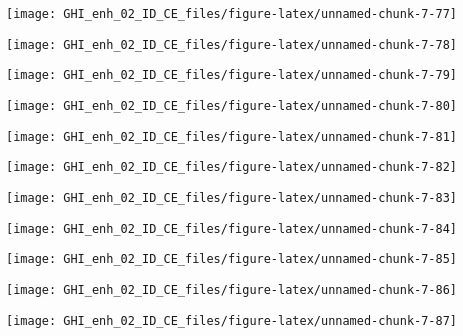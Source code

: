 \documentclass[
  10pt,
  a4paper,oneside]{article}
\begin{document}
\begin{center}\texttt{[image: GHI\_enh\_02\_ID\_CE\_files/figure-latex/unnamed-chunk-7-77]} \end{center}

\begin{center}\texttt{[image: GHI\_enh\_02\_ID\_CE\_files/figure-latex/unnamed-chunk-7-78]} \end{center}

\begin{center}\texttt{[image: GHI\_enh\_02\_ID\_CE\_files/figure-latex/unnamed-chunk-7-79]} \end{center}

\begin{center}\texttt{[image: GHI\_enh\_02\_ID\_CE\_files/figure-latex/unnamed-chunk-7-80]} \end{center}

\begin{center}\texttt{[image: GHI\_enh\_02\_ID\_CE\_files/figure-latex/unnamed-chunk-7-81]} \end{center}

\begin{center}\texttt{[image: GHI\_enh\_02\_ID\_CE\_files/figure-latex/unnamed-chunk-7-82]} \end{center}

\begin{center}\texttt{[image: GHI\_enh\_02\_ID\_CE\_files/figure-latex/unnamed-chunk-7-83]} \end{center}

\begin{center}\texttt{[image: GHI\_enh\_02\_ID\_CE\_files/figure-latex/unnamed-chunk-7-84]} \end{center}

\begin{center}\texttt{[image: GHI\_enh\_02\_ID\_CE\_files/figure-latex/unnamed-chunk-7-85]} \end{center}

\begin{center}\texttt{[image: GHI\_enh\_02\_ID\_CE\_files/figure-latex/unnamed-chunk-7-86]} \end{center}

\begin{center}\texttt{[image: GHI\_enh\_02\_ID\_CE\_files/figure-latex/unnamed-chunk-7-87]} \end{center}
\end{document}
